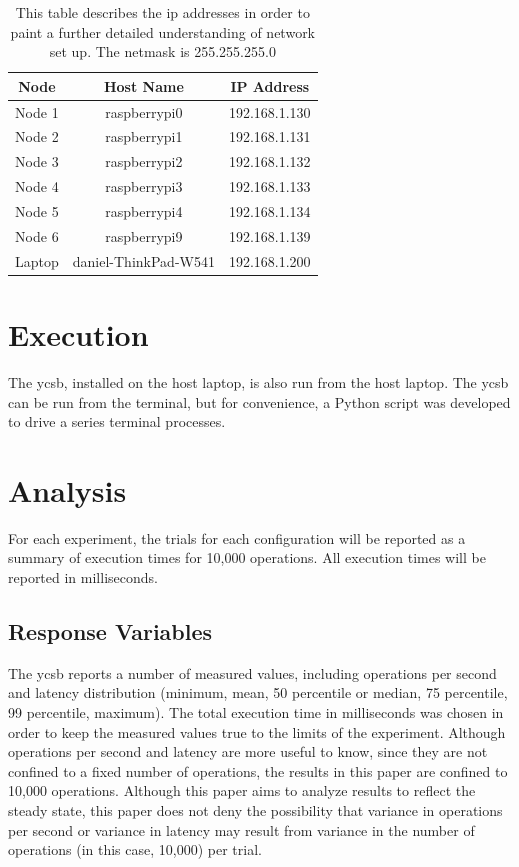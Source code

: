 \begin{table}
\begin{center}
 \begin{tabular}{||c c c||} 
 \hline
 Node & Host Name & IP Address \\ [0.5ex] 
 \hline\hline
 Node 1 & raspberrypi0 & 192.168.1.130 \\ 
 \hline
 Node 2 & raspberrypi1 & 192.168.1.131  \\
 \hline
 Node 3 & raspberrypi2 & 192.168.1.132 \\
 \hline
 Node 4 & raspberrypi3 & 192.168.1.133 \\
 \hline
 Node 5 & raspberrypi4 & 192.168.1.134 \\
 \hline
 Node 6 & raspberrypi9 & 192.168.1.139 \\
 \hline 
 Laptop & daniel-ThinkPad-W541 &192.168.1.200 \\
 \hline
\end{tabular}
\end{center}
\caption{This table describes the \gls{ip} addresses in order to paint a further detailed understanding of network set up.  The netmask is 255.255.255.0}
\label{table:ip_addresses_rp_wireless}
\end{table}

\section{Execution}

The \gls{ycsb}, installed on the host laptop, is also run from the host laptop.  The \gls{ycsb} can be run from the terminal, but for convenience, a Python script was developed to drive a series terminal processes.

\section{Analysis}

For each experiment, the trials for each configuration will be reported as a summary of execution times for 10,000 operations.  All execution times will be reported in milliseconds.

\subsection{Response Variables}

The \gls{ycsb} reports a number of measured values, including operations per second and latency distribution (minimum, mean, 50 percentile or median, 75 percentile, 99 percentile, maximum).  The total execution time in milliseconds was chosen in order to keep the measured values true to the limits of the experiment.  Although operations per second and latency are more useful to know, since they are not confined to a fixed number of operations, the results in this paper are confined to 10,000 operations.  Although this paper aims to analyze results to reflect the steady state, this paper does not deny the possibility that variance in operations per second or variance in latency may result from variance in the number of operations (in this case, 10,000) per trial. 

